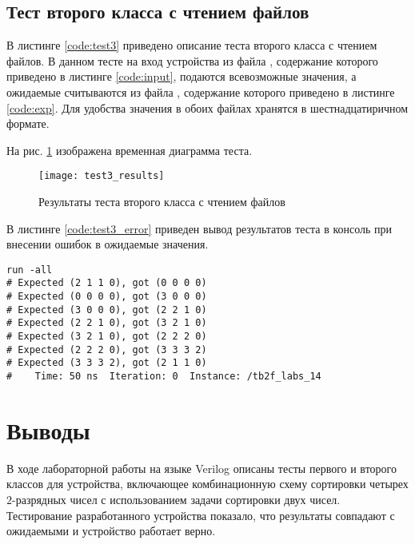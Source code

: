 \subsection{Тест второго класса с чтением файлов}

В листинге \ref{code:test3} приведено описание теста второго класса с чтением файлов. В данном тесте на вход устройства из файла , содержание которого приведено в листинге \ref{code:input}, подаются всевозможные значения, а ожидаемые считываются из файла , содержание которого приведено в листинге \ref{code:exp}. Для удобства значения в обоих файлах хранятся в шестнадцатиричном формате.

\begin{multicols}{2}
		
	
\end{multicols}

На рис. \ref{fig:test3_results} изображена временная диаграмма теста.
\vspace{-0.5cm}
\begin{figure}[H]
	\begin{center}
		\texttt{[image: test3\_results]}
		\caption{Результаты теста второго класса с чтением файлов}
		\label{fig:test3_results}
	\end{center}
\end{figure}
\vspace{-0.5cm}

В листинге \ref{code:test3_error} приведен вывод результатов теста в консоль при внесении ошибок в ожидаемые значения.
\begin{lstlisting}[caption=Результаты ошибочного теста второго класса с чтением файлов, label=code:test3_error, style=console]
run -all
# Expected (2 1 1 0), got (0 0 0 0)
# Expected (0 0 0 0), got (3 0 0 0)
# Expected (3 0 0 0), got (2 2 1 0)
# Expected (2 2 1 0), got (3 2 1 0)
# Expected (3 2 1 0), got (2 2 2 0)
# Expected (2 2 2 0), got (3 3 3 2)
# Expected (3 3 3 2), got (2 1 1 0)
#    Time: 50 ns  Iteration: 0  Instance: /tb2f_labs_14
\end{lstlisting}

\section{Выводы}

В ходе лабораторной работы на языке Verilog описаны тесты первого и второго классов для устройства, включающее комбинационную схему сортировки четырех $2$-разрядных чисел с использованием задачи сортировки двух чисел. Тестирование разработанного устройства показало, что результаты совпадают с ожидаемыми и устройство работает верно.

